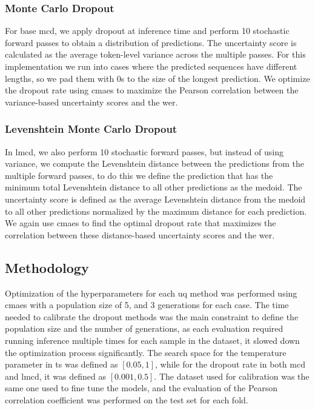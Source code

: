 \documentclass[11pt]{article}
\begin{document}
\subsubsection{Monte Carlo Dropout}
For base \acrshort{mcd}, we apply dropout at inference time and perform 10 stochastic forward passes to obtain a distribution of predictions. The uncertainty score is calculated as the average token-level variance across the multiple passes.
For this implementation we run into cases where the predicted sequences have different lengths, so we pad them with 0s to the size of the longest prediction.
We optimize the dropout rate using \acrshort{cmaes} to maximize the Pearson correlation between the variance-based uncertainty scores and the \acrshort{wer}.

\subsubsection{Levenshtein Monte Carlo Dropout}
In \acrshort{lmcd}, we also perform 10 stochastic forward passes, but instead of using variance, we compute the Levenshtein distance between the predictions from the multiple forward passes, to do this we define the prediction that has the minimum total Levenshtein distance to all other predictions as the medoid. 
The uncertainty score is defined as the average Levenshtein distance from the medoid to all other predictions normalized by the maximum distance for each prediction. 
We again use \acrshort{cmaes} to find the optimal dropout rate that maximizes the correlation between these distance-based uncertainty scores and the \acrshort{wer}.

\subsection{Methodology}

Optimization of the hyperparameters for each \acrshort{uq} method was performed using \acrshort{cmaes} with a population size of 5, and 3 generations for each case. The time needed to calibrate the dropout methods was the main constraint to define the population size and the number of generations, as each evaluation required running inference multiple times for each sample in the dataset, it slowed down the optimization process significantly. 
The search space for the temperature parameter in \acrshort{ts} was defined as $[0.05, 1]$, while for the dropout rate in both \acrshort{mcd} and \acrshort{lmcd}, it was defined as $[0.001, 0.5]$.
The dataset used for calibration was the same one used to fine tune the models, and the evaluation of the Pearson correlation coefficient was performed on the test set for each fold.
\end{document}

